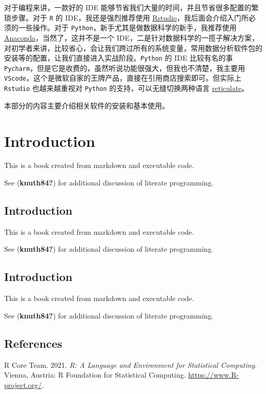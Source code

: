 \documentclass[
  letterpaper,
  DIV=11]{scrreport}
\newlength{\cslhangindent}
\newlength{\cslentryspacingunit} %
\newenvironment{CSLReferences}[2] %
 {%
  \setlength{\parindent}{0pt}
  \ifodd #1
  \let\oldpar\par
  \def\par{\hangindent=\cslhangindent\oldpar}
  \fi
  \setlength{\parskip}{#2\cslentryspacingunit}
 }%
 {}
\begin{document}
对于编程来讲，一款好的 IDE
能够节省我们大量的时间，并且节省很多配置的繁琐步骤。对于 \texttt{R} 的
IDE，我还是强烈推荐使用
\href{https://www.rstudio.com}{Rstudio}，我后面会介绍入门所必须的一些操作。对于
\texttt{Python}，新手尤其是做数据科学的新手，我推荐使用
\href{https://www.anaconda.com/}{Anaconda}，当然了，这并不是一个
IDE，二是针对数据科学的一揽子解决方案，对初学者来讲，比较省心，会让我们跨过所有的系统变量，常用数据分析软件包的安装等的配置，让我们直接进入实战阶段。\texttt{Python}
的 IDE 比较有名的事
\texttt{Pycharm}，但是它是收费的，虽然听说功能很强大，但我也不清楚，我主要用
\texttt{VScode}，这个是微软自家的王牌产品，直接在引用商店搜索即可。但实际上
\texttt{Rstudio} 也越来越重视对 \texttt{Python}
的支持，可以无缝切换两种语言
\href{https://rstudio.github.io/reticulate/articles/rstudio_ide.html}{reticulate}。

本部分的内容主要介绍相关软件的安装和基本使用。

\part{Introduction}

This is a book created from markdown and executable code.

See (\textbf{knuth84?}) for additional discussion of literate
programming.

\hypertarget{introduction-1}{%
\chapter{Introduction}\label{introduction-1}}

This is a book created from markdown and executable code.

See (\textbf{knuth84?}) for additional discussion of literate
programming.

\hypertarget{introduction-2}{%
\chapter{Introduction}\label{introduction-2}}

This is a book created from markdown and executable code.

See (\textbf{knuth84?}) for additional discussion of literate
programming.

\hypertarget{references}{%
\chapter*{References}\label{references}}

\hypertarget{refs}{}
\begin{CSLReferences}{1}{0}
\leavevmode{}%
R Core Team. 2021. \emph{R: A Language and Environment for Statistical
Computing}. Vienna, Austria: R Foundation for Statistical Computing.
\url{https://www.R-project.org/}.

\end{CSLReferences}

\appendix
{}
\end{document}
